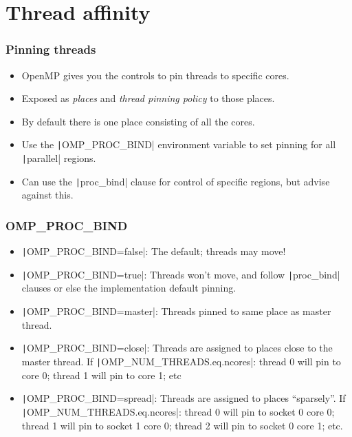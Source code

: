 \documentclass{beamer}
\begin{document}
\section{Thread affinity}
\begin{frame}
\frametitle{Pinning threads}
\begin{itemize}
  \item OpenMP gives you the controls to pin threads to specific cores.
  \item Exposed as \emph{places} and \emph{thread pinning policy} to those places.
  \item By default there is one place consisting of all the cores.
  \item Use the \texttt|OMP_PROC_BIND| environment variable to set pinning for all \texttt|parallel| regions.
  \item Can use the \texttt|proc_bind| clause for control of specific regions, but advise against this.
\end{itemize}
\end{frame}

\begin{frame}
\frametitle{OMP\_PROC\_BIND}
\begin{itemize}
  \item \texttt|OMP_PROC_BIND=false|: The default; threads may move!
  \item \texttt|OMP_PROC_BIND=true|: Threads won't move, and follow \texttt|proc_bind| clauses or else the implementation default pinning.
  \item \texttt|OMP_PROC_BIND=master|: Threads pinned to same place as master thread.
  \item \texttt|OMP_PROC_BIND=close|: Threads are assigned to places close to the master thread.
  If \texttt|OMP_NUM_THREADS.eq.ncores|: thread 0 will pin to core 0; thread 1 will pin to core 1; etc
  \item \texttt|OMP_PROC_BIND=spread|: Threads are assigned to places ``sparsely''.
  If \texttt|OMP_NUM_THREADS.eq.ncores|: thread 0 will pin to socket 0 core 0; thread 1 will pin to socket 1 core 0; thread 2 will pin to socket 0 core 1; etc.
\end{itemize}
\end{frame}
\end{document}
